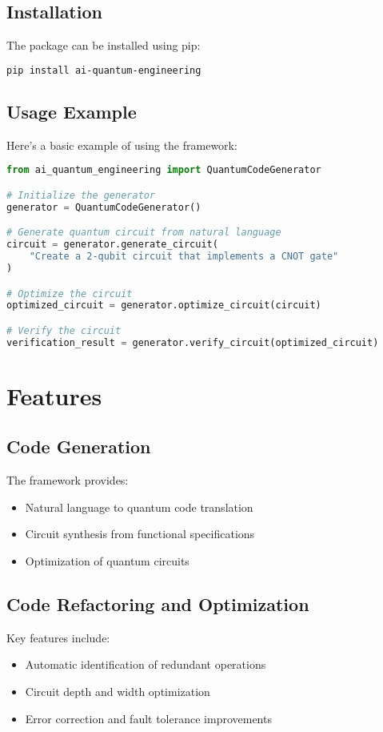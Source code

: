 \documentclass[10pt,twocolumn]{article}
\begin{document}
\subsection{Installation}
The package can be installed using pip:
\begin{lstlisting}[language=bash]
pip install ai-quantum-engineering
\end{lstlisting}

\subsection{Usage Example}
Here's a basic example of using the framework:
\begin{lstlisting}[language=python]
from ai_quantum_engineering import QuantumCodeGenerator

# Initialize the generator
generator = QuantumCodeGenerator()

# Generate quantum circuit from natural language
circuit = generator.generate_circuit(
    "Create a 2-qubit circuit that implements a CNOT gate"
)

# Optimize the circuit
optimized_circuit = generator.optimize_circuit(circuit)

# Verify the circuit
verification_result = generator.verify_circuit(optimized_circuit)
\end{lstlisting}

\section{Features}
\subsection{Code Generation}
The framework provides:
\begin{itemize}[leftmargin=*]
    \item Natural language to quantum code translation
    \item Circuit synthesis from functional specifications
    \item Optimization of quantum circuits
\end{itemize}

\subsection{Code Refactoring and Optimization}
Key features include:
\begin{itemize}[leftmargin=*]
    \item Automatic identification of redundant operations
    \item Circuit depth and width optimization
    \item Error correction and fault tolerance improvements
\end{itemize}
\end{document}
